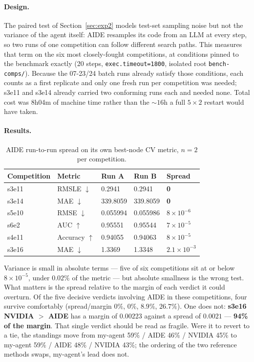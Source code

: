 \documentclass[11pt,a4paper]{article}
\newcommand{\dn}{\ensuremath{\downarrow}}
\newcommand{\up}{\ensuremath{\uparrow}}
\begin{document}
\paragraph{Design.} The paired test of Section~\ref{sec:exp2} models test-set sampling noise but not the variance of the agent itself: AIDE resamples its code from an LLM at every step, so two runs of one competition can follow different search paths. This measures that term on the six most closely-fought competitions, at conditions pinned to the benchmark exactly (20 steps, \texttt{exec.timeout=1800}, isolated root \texttt{bench-comps/}). Because the 07-23/24 batch runs already satisfy those conditions, each counts as a first replicate and only one fresh run per competition was needed; s3e11 and s3e14 already carried two conforming runs each and needed none. Total cost was 8h04m of machine time rather than the ${\sim}16$h a full $5\times2$ restart would have taken.

\paragraph{Results.}
\begin{table}[H]
\centering\small
\caption{AIDE run-to-run spread on its own best-node CV metric, $n=2$ per competition.}
\begin{tabular}{@{}lllll@{}}
\toprule
\textbf{Competition} & \textbf{Metric} & \textbf{Run A} & \textbf{Run B} & \textbf{Spread} \\
\midrule
s3e11 & RMSLE \dn & 0.2941 & 0.2941 & \textbf{0} \\
s3e14 & MAE \dn & 339.8059 & 339.8059 & \textbf{0} \\
s5e10 & RMSE \dn & 0.055994 & 0.055986 & $8\times10^{-6}$ \\
s6e2 & AUC \up & 0.95551 & 0.95544 & $7\times10^{-5}$ \\
s4e11 & Accuracy \up & 0.94055 & 0.94063 & $8\times10^{-5}$ \\
s3e16 & MAE \dn & 1.3369 & 1.3348 & $2.1\times10^{-3}$ \\
\bottomrule
\end{tabular}
\end{table}

Variance is small in absolute terms --- five of six competitions sit at or below $8\times10^{-5}$, under $0.02\%$ of the metric --- but absolute smallness is the wrong test. What matters is the spread relative to the margin of each verdict it could overturn. Of the five decisive verdicts involving AIDE in these competitions, four survive comfortably (spread/margin $0\%$, $0\%$, $8.9\%$, $26.7\%$). One does not: \textbf{s3e16 NVIDIA $>$ AIDE} has a margin of $0.00223$ against a spread of $0.0021$ --- \textbf{94\% of the margin}. That single verdict should be read as fragile. Were it to revert to a tie, the standings move from my-agent 59\% / AIDE 46\% / NVIDIA 45\% to my-agent 59\% / AIDE 48\% / NVIDIA 43\%; the ordering of the two reference methods swaps, my-agent's lead does not.
\end{document}
